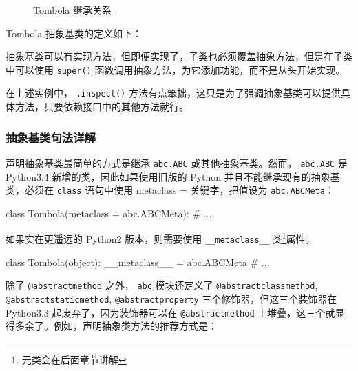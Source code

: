 \begin{figure}[H]
    \caption{Tombola 继承关系}
    \label{Tombola 继承关系}
\end{figure}

Tombola 抽象基类的定义如下：



抽象基类可以有实现方法，但即便实现了，子类也必须覆盖抽象方法，但是在子类中可以使用 \texttt{super()} 函数调用抽象方法，为它添加功能，而不是从头开始实现。

在上述实例中， \texttt{.inspect()} 方法有点笨拙，这只是为了强调抽象基类可以提供具体方法，只要依赖接口中的其他方法就行。

\subsubsection{抽象基类句法详解}

声明抽象基类最简单的方式是继承 \texttt{abc.ABC} 或其他抽象基类。然而， \texttt{abc.ABC} 是 Python3.4 新增的类，因此如果使用旧版的 Python 并且不能继承现有的抽象基类，必须在 \texttt{class} 语句中使用 metaclass = 关键字，把值设为 \texttt{abc.ABCMeta}：

\begin{python}
    class Tombola(metaclass = abc.ABCMeta):
    # ...
\end{python}

如果实在更遥远的 Python2 版本，则需要使用 \texttt{\_\_metaclass\_\_} 类\footnote{元类会在后面章节讲解}属性。

\begin{python}
    class Tombola(object):
    __metaclass__ = abc.ABCMeta
    # ...
\end{python}

除了 \texttt{@abstractmethod} 之外， \texttt{abc} 模块还定义了 \texttt{@abstractclassmethod}, \texttt{@abstractstaticmethod}, \texttt{@abstractproperty} 三个修饰器，但这三个装饰器在 Python3.3 起废弃了，因为装饰器可以在 \texttt{@abstractmethod} 上堆叠，这三个就显得多余了。例如，声明抽象类方法的推荐方式是：

